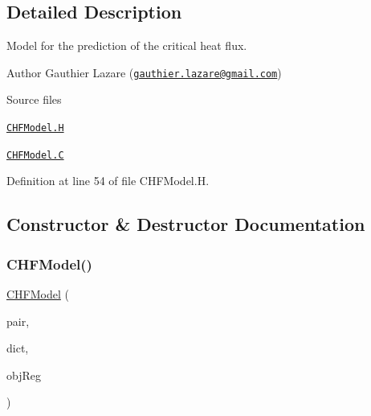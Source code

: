 \subsection{Detailed Description}
Model for the prediction of the critical heat flux. 

\label{_Description}%
 Author Gauthier Lazare (\href{mailto:gauthier.lazare@gmail.com}{\tt gauthier.\+lazare@gmail.\+com})

\begin{DoxyParagraph}{Source files}

\begin{DoxyItemize}
\item \href{../../../home/carlo/data/GeN-Foam/GeN-Foam_ffn/GeN-Foam/GeN-Foam/classes/thermalHydraulics/src/physicsModels/heatTransferModels/FSHeatTransferCoefficientModels/subModels/CHFModels/criticalHeatFluxModels/CHFModel.H}{\tt C\+H\+F\+Model.\+H} 
\item \href{../../../home/carlo/data/GeN-Foam/GeN-Foam_ffn/GeN-Foam/GeN-Foam/classes/thermalHydraulics/src/physicsModels/heatTransferModels/FSHeatTransferCoefficientModels/subModels/CHFModels/criticalHeatFluxModels/CHFModel.C}{\tt C\+H\+F\+Model.\+C} 
\end{DoxyItemize}
\end{DoxyParagraph}


Definition at line 54 of file C\+H\+F\+Model.\+H.



\subsection{Constructor \& Destructor Documentation}
\mbox{\label{classFoam_1_1CHFModel_a4393f152a32ddfec3ddc080f0690c88c}} 
\subsubsection{\texorpdfstring{C\+H\+F\+Model()}{CHFModel()}}
{\footnotesize\ttfamily \hyperlink{classFoam_1_1CHFModel}{C\+H\+F\+Model} (\begin{DoxyParamCaption}\item[{const \hyperlink{classFoam_1_1FSPair}{F\+S\+Pair} \&}]{pair,  }\item[{const dictionary \&}]{dict,  }\item[{const object\+Registry \&}]{obj\+Reg }\end{DoxyParamCaption})}



